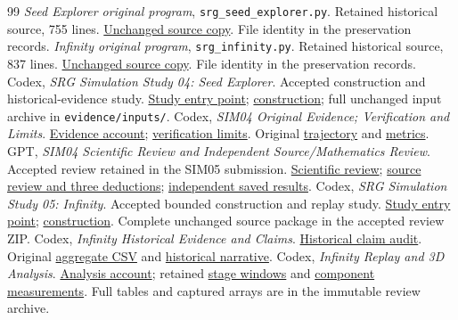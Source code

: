 \begin{thebibliography}{99}
 \emph{Seed Explorer original program}, \texttt{srg\_seed\_explorer.py}. Retained historical source, 755 lines. \href{evidence/originals/SIM04/srg_seed_explorer.py}{Unchanged source copy}. File identity in the preservation records.
 \emph{Infinity original program}, \texttt{srg\_infinity.py}. Retained historical source, 837 lines. \href{evidence/originals/SIM05/srg_infinity.py}{Unchanged source copy}. File identity in the preservation records.
 Codex, \emph{SRG Simulation Study 04: Seed Explorer}. Accepted construction and historical-evidence study. \href{evidence/studies/SIM04/START_HERE.md}{Study entry point}; \href{evidence/studies/SIM04/CONSTRUCTION.md}{construction}; full unchanged input archive in \texttt{evidence/inputs/}.
 Codex, \emph{SIM04 Original Evidence; Verification and Limits}. \href{evidence/studies/SIM04/ORIGINAL_EVIDENCE.md}{Evidence account}; \href{evidence/studies/SIM04/VERIFICATION_AND_LIMITS.md}{verification limits}. Original \href{evidence/originals/SIM04/deep_trajectory.csv}{trajectory} and \href{evidence/originals/SIM04/pass_metrics.csv}{metrics}.
 GPT, \emph{SIM04 Scientific Review and Independent Source/Mathematics Review}. Accepted review retained in the SIM05 submission. \href{evidence/reviews/SIM04/SIM04_GPT_SCIENTIFIC_REVIEW.md}{Scientific review}; \href{evidence/reviews/SIM04/source_review.md}{source review and three deductions}; \href{evidence/reviews/SIM04/independent_data/independent_checks.json}{independent saved results}.
 Codex, \emph{SRG Simulation Study 05: Infinity}. Accepted bounded construction and replay study. \href{evidence/studies/SIM05/START_HERE.md}{Study entry point}; \href{evidence/studies/SIM05/CONSTRUCTION.md}{construction}. Complete unchanged source package in the accepted review ZIP.
 Codex, \emph{Infinity Historical Evidence and Claims}. \href{evidence/studies/SIM05/HISTORICAL_EVIDENCE_AND_CLAIMS.md}{Historical claim audit}. Original \href{evidence/originals/SIM05/srg_infinity_asymptotic.csv}{aggregate CSV} and \href{evidence/originals/SIM05/SRG_Infinity_Seeds.md}{historical narrative}.
 Codex, \emph{Infinity Replay and 3D Analysis}. \href{evidence/studies/SIM05/REPLAY_AND_3D_ANALYSIS.md}{Analysis account}; retained \href{evidence/tables/SIM05/stage_windows.csv}{stage windows} and \href{evidence/tables/SIM05/component_geometry.csv}{component measurements}. Full tables and captured arrays are in the immutable review archive.

\end{thebibliography}
